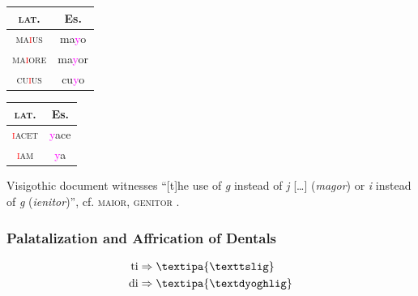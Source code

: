 \documentclass{report}[12pt]
\begin{document}
\begin{tabular}{c c}
  \textsc{lat.} & Es. \\
  \hline
  \textsc{ma\textcolor{red}{i}us} & ma\textcolor{magenta}{y}o \\
  \textsc{ma\textcolor{red}{i}ore} & ma\textcolor{magenta}{y}or \\
  \textsc{cu\textcolor{red}{i}us} & cu\textcolor{magenta}{y}o \\
\end{tabular}

\begin{tabular}{c c}
  \textsc{lat.} & Es. \\
  \hline
  \textsc{\textcolor{red}{i}acet} & \textcolor{magenta}{y}ace \\
  \textsc{\textcolor{red}{i}am} & \textcolor{magenta}{y}a \\
\end{tabular}

Visigothic document witnesses ``[t]he use of \emph{g} instead of \emph{j} [\dots] (\emph{magor}) or \emph{i} instead of \emph{g} (\emph{ienitor})'', cf. \textsc{maior}, \textsc{genitor} \parencite[p.~159]{latin_palaeography}.

\subsubsection{Palatalization and Affrication of Dentals}\label{sec:dental_palatalization}

\begin{tcolorbox}
  \begin{align*}
    \text{ti} & \Rightarrow \text{\textipa{\texttslig}} \\
    \text{di} & \Rightarrow \text{\textipa{\textdyoghlig}} \\
  \end{align*}
\end{tcolorbox}
\end{document}
